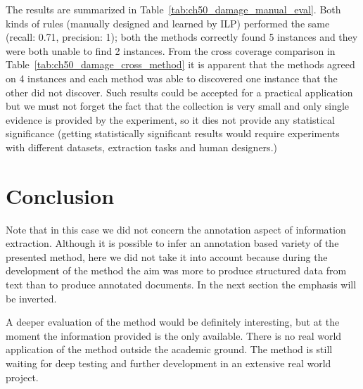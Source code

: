 The results are summarized in Table~\ref{tab:ch50_damage_manual_eval}. Both kinds of rules (manually designed and learned by ILP) performed the same (recall: 0.71, precision: 1); both the methods correctly found 5 instances and they were both unable to find 2 instances. From the cross coverage comparison in 
Table~\ref{tab:ch50_damage_cross_method} it is apparent that the methods agreed on 4 instances and each method was able to discovered one instance that the other did not discover. Such results could be accepted for a practical application but we must not forget the fact that the collection is very small and only single evidence is provided by the experiment, so it dies not provide any statistical significance (getting statistically significant results would require experiments with different datasets, extraction tasks and human designers.) 



\section{Conclusion}

Note that in this case we did not concern the annotation aspect of information extraction. Although it is possible to infer an annotation based variety of the presented method, here we did not take it into account because during the development of the method the aim was more to produce structured data from text than to produce annotated documents. In the next section the emphasis will be inverted. 

A deeper evaluation of the method would be definitely interesting, but at the moment the information provided is the only available. There is no real world application of the method outside the academic ground. The method is still waiting for deep testing and further development in an extensive real world project.

